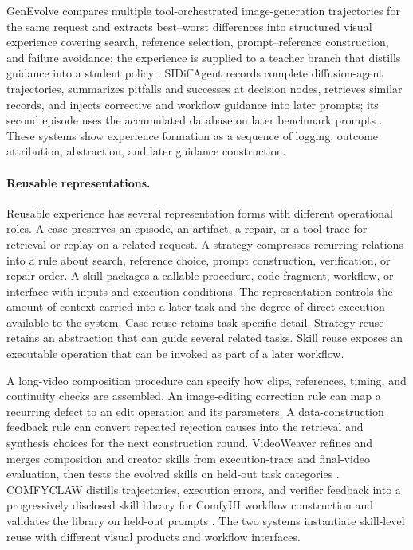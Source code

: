 GenEvolve compares multiple tool-orchestrated image-generation trajectories for the same request and extracts best--worst differences into structured visual experience covering search, reference selection, prompt--reference construction, and failure avoidance; the experience is supplied to a teacher branch that distills guidance into a student policy \cite{chen2026genevolve}. SIDiffAgent records complete diffusion-agent trajectories, summarizes pitfalls and successes at decision nodes, retrieves similar records, and injects corrective and workflow guidance into later prompts; its second episode uses the accumulated database on later benchmark prompts \cite{avg260202051}. These systems show experience formation as a sequence of logging, outcome attribution, abstraction, and later guidance construction.

\paragraph{Reusable representations.}
Reusable experience has several representation forms with different operational roles. A case preserves an episode, an artifact, a repair, or a tool trace for retrieval or replay on a related request. A strategy compresses recurring relations into a rule about search, reference choice, prompt construction, verification, or repair order. A skill packages a callable procedure, code fragment, workflow, or interface with inputs and execution conditions. The representation controls the amount of context carried into a later task and the degree of direct execution available to the system. Case reuse retains task-specific detail. Strategy reuse retains an abstraction that can guide several related tasks. Skill reuse exposes an executable operation that can be invoked as part of a later workflow.

A long-video composition procedure can specify how clips, references, timing, and continuity checks are assembled. An image-editing correction rule can map a recurring defect to an edit operation and its parameters. A data-construction feedback rule can convert repeated rejection causes into the retrieval and synthesis choices for the next construction round. VideoWeaver refines and merges composition and creator skills from execution-trace and final-video evaluation, then tests the evolved skills on held-out task categories \cite{avg260608091}. COMFYCLAW distills trajectories, execution errors, and verifier feedback into a progressively disclosed skill library for ComfyUI workflow construction and validates the library on held-out prompts \cite{avg260701709}. The two systems instantiate skill-level reuse with different visual products and workflow interfaces.

